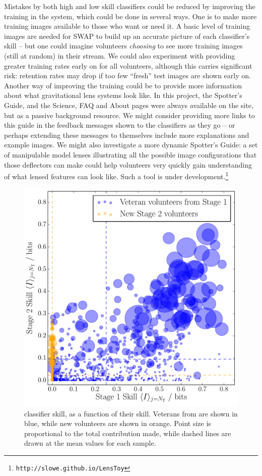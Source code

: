 \documentclass[useAMS,usenatbib,a4paper]{mn2e}
\begin{document}
Mistakes by both high and low skill classifiers could be reduced by improving
the training in the system, which could be done in several ways. One is to make
more training images available to those who want or need it. A basic level of
training images are needed for SWAP to build up an accurate picture of each
classifier's skill -- but one could imagine volunteers {\it choosing} to see
more training images (still at random) in their stream. We could also experiment
with providing greater training rates early on for all volunteers, although
this carries significant risk: retention rates may drop if too few ``fresh'' test
images are shown early on. Another way of improving the training could be to
provide more information about what gravitational lens systems look like. In
this project, the Spotter's Guide, and the Science, FAQ and About pages were
always available on the site, but as a passive background resource. We might
consider providing more links to this guide in the feedback messages shown to
the classifiers as they go -- or perhaps extending these messages to themselves
include more explanations and example images. We might also investigate a more
dynamic Spotter's Guide: a set of manipulable model lenses illustrating all the
possible image configurations that those deflectors can make could help
volunteers very quickly gain understanding of what lensed features can look
like. Such a tool is under development.\footnote{\texttt{http://slowe.github.io/LensToy}}

\begin{figure}
\centering\includegraphics[width=0.9\linewidth]{stage2_veteran_contribution.pdf}
\caption{\StageTwo classifier skill, as a function of their \StageOne skill.
Veterans from \StageOne  are shown in blue, while new volunteers are shown in
orange. Point size is proportional to the total contribution made,
while dashed lines are drawn at the mean values for each sample.}
\label{fig:discuss:performance:stage1vstage2}
\end{figure}
\end{document}
